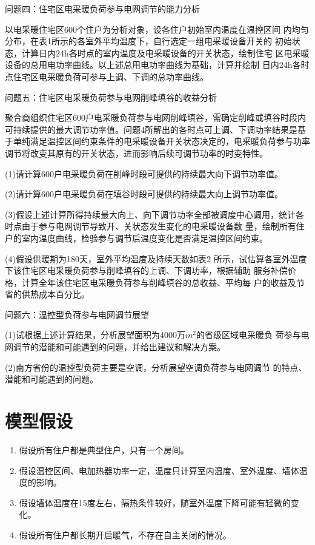 \documentclass[withoutpreface,bwprint]{cumcmthesis} %
\begin{document}
问题四：住宅区电采暖负荷参与电网调节的能力分析

以电采暖住宅区600个住户为分析对象，设各住户初始室内温度在温控区间 内均匀分布，在表1所示的各室外平均温度下，自行选定一组电采暖设备开关的 初始状态，计算日内24h各时点的室内温度及电采暖设备的开关状态，绘制住宅 区电采暖设备的总用电功率曲线。以上述总用电功率曲线为基础，计算并绘制 日内24h各时点住宅区电采暖负荷可参与上调、下调的总功率曲线。

问题五：住宅区电采暖负荷参与电网削峰填谷的收益分析

聚合商组织住宅区600户电采暖负荷参与电网削峰填谷，需确定削峰或填谷时段内可持续提供的最大调节功率值。问题4所解出的各时点可上调、下调功率结果是基于单纯满足温控区间约束条件的电采暖设备开关状态决定的，电采暖负荷参与功率调节将改变其原有的开关状态，进而影响后续可调节功率的时变特性。

(1)请计算600户电采暖负荷在削峰时段可提供的持续最大向下调节功率值。 

(2)请计算600户电采暖负荷在填谷时段可提供的持续最大向上调节功率值。 

(3)假设上述计算所得持续最大向上、向下调节功率全部被调度中心调用，统计各时点由于参与电网调节导致开、关状态发生变化的电采暖设备数 量，绘制所有住户的室内温度曲线，检验参与调节后温度变化是否满足温控区间约束。

(4)假设供暖期为180天，室外平均温度及持续天数如表2 所示，试估算各室外温度下该住宅区电采暖负荷参与削峰填谷的上调、下调功率，根据辅助 服务补偿价格，计算全年该住宅区电采暖负荷参与削峰填谷的总收益、平均每 户的收益及节省的供热成本百分比。

问题六：温控型负荷参与电网调节展望

(1)试根据上述计算结果，分析展望面积为4000万$m^2$的省级区域电采暖负 荷参与电网调节的潜能和可能遇到的问题，并给出建议和解决方案。

(2)南方省份的温控型负荷主要是空调，分析展望空调负荷参与电网调节 的特点、潜能和可能遇到的问题。
\section{模型假设}
\begin{enumerate}
    \item 假设所有住户都是典型住户，只有一个房间。
 \item 假设温控区间、电加热器功率一定，温度只计算室内温度、室外温度、墙体温度的影响。
 \item 假设墙体温度在15度左右，隔热条件较好，随室外温度下降可能有轻微的变化。
 \item 假设所有住户都长期开启暖气，不存在自主关闭的情况。
\end{enumerate}
\end{document}
